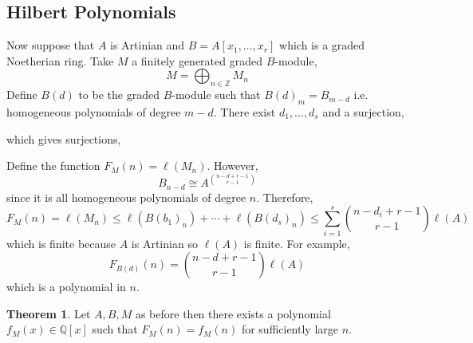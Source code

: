 \documentclass[12pt]{article}
\newcommand{\Z}{\mathbb{Z}}
\newcommand{\Q}{\mathbb{Q}}
\theoremstyle{remark}
\theoremstyle{definition}
\newtheorem{theorem}{Theorem}[section]
\begin{document}
\subsection{Hilbert Polynomials}

Now suppose that $A$ is Artinian and $B = A[x_1, \dots, x_r]$ which is a graded Noetherian ring. Take $M$ a finitely generated graded $B$-module,
\[ M = \bigoplus_{n \in \Z} M_n \]
Define $B(d)$ to be the graded $B$-module such that $B(d)_m = B_{m - d}$ i.e. homogeneous polynomials of degree $m - d$. There exist $d_1, \dots, d_s$ and a surjection,
\begin{center}
\end{center}
which gives surjections,
\begin{center}
\end{center}
Define the function $F_M(n) = \ell(M_n)$. However,
\[ B_{n - d} \cong A^{ n - d + r - 1 \choose r - 1 } \]
since it is all homogeneous polynomials of degree $n$. Therefore, 
\[ F_M(n) = \ell(M_n) \le \ell(B(b_1)_n) + \cdots + \ell(B(d_s)_n) \le \sum_{i = 1}^s {n - d_i + r - 1 \choose r - 1} \ell(A) \]
which is finite because $A$ is Artinian so $\ell(A)$ is finite. For example,
\[ F_{B(d)}(n) = {n - d + r - 1 \choose r - 1} \ell(A) \]
which is a polynomial in $n$.

\begin{theorem}
Let $A,B,M$ as before then there exists a polynomial $f_M(x) \in \Q[x]$ such that $F_M(n) = f_M(n)$ for sufficiently large $n$. 
\end{theorem}
\end{document}
